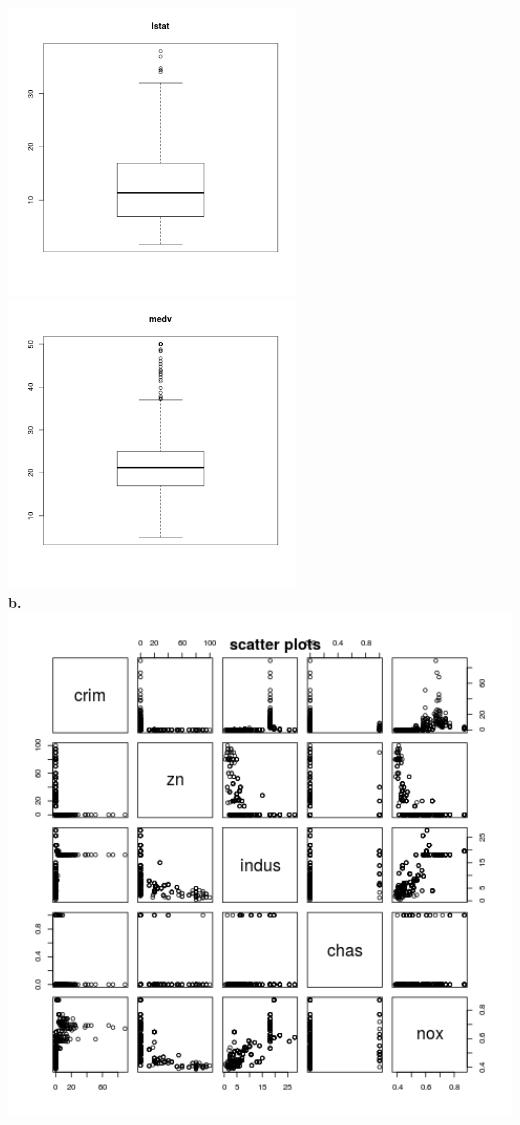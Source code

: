 \message{ !name(hw1.tex)}\documentclass{article}
\begin{document}
\includegraphics[width=3in]{13.png}
\includegraphics[width=3in]{14.png}
~\\
\clearpage
\textbf{b.}\\
\includegraphics[width=6in]{scatter.png}
\end{document}
